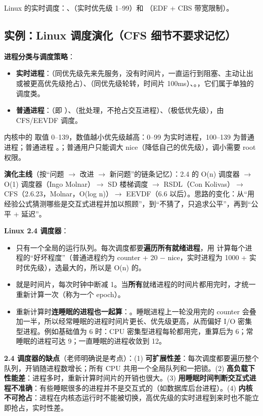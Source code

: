 Linux 的实时调度：、（实时优先级 1–99）和 （EDF + CBS 带宽限制）。

\subsection{实例：Linux 调度演化（CFS 细节不要求记忆）}

\textbf{进程分类与调度策略}：
\begin{itemize}
    \item \textbf{实时进程}：（同优先级先来先服务，没有时间片，一直运行到阻塞、主动让出或被更高优先级抢占）、（同优先级轮转，时间片 100ms）、。，它们属于单独的调度类。
    \item \textbf{普通进程}：（即 ）、（批处理，不抢占交互进程）、（极低优先级），由 CFS/EEVDF 调度。
\end{itemize}
内核中的  取值 0–139，数值越小优先级越高：0–99 为实时进程，100–139 为普通进程；普通进程 。\ez {}；普通用户只能调大 nice（降低自己的优先级），调小需要 root 权限。

\textbf{演化主线}（按“问题 $\to$ 改进 $\to$ 新问题”的链条记忆）：2.4 的 O(n) 调度器 $\to$ O(1) 调度器（Ingo Molnar）$\to$ SD 楼梯调度 $\to$ RSDL（Con Kolivas）$\to$ CFS（2.6.23，Molnar，O(log n)）$\to$ EEVDF（6.6 以后）。思路的变化：从“用经验公式猜测哪些是交互式进程并加以照顾”，到“不猜了，只追求公平”，再到“公平 + 延迟”。

\textbf{Linux 2.4 调度器}：
\begin{itemize}
    \item 只有一个全局的运行队列。每次调度都要\textbf{遍历所有就绪进程}，用  计算每个进程的“好坏程度”（普通进程约为 counter + 20 $-$ nice，实时进程为 1000 + 实时优先级），选最大的，所以是 O(n) 的。
    \item {} 就是时间片，每次时钟中断减 1。当\textbf{所有}就绪进程的时间片都用完时，才统一重新计算一次（称为一个 epoch）。
    \item 重新计算时\textbf{连睡眠的进程也一起算}：。睡眠进程上一轮没用完的 counter 会叠加一半，所以经常睡眠的进程时间片更长、优先级更高，从而偏好 I/O 密集型进程。例如基础值为 6 时：CPU 密集型进程每轮都用完，重算后为 6；常睡眠的进程可达 9；一直睡眠的进程收敛到 12。
\end{itemize}
\bk \textbf{2.4 调度器的缺点}（老师明确说是考点）：(1) \textbf{可扩展性差}：每次调度都要遍历整个队列，开销随进程数增长；所有 CPU 共用一个全局队列和一把锁。(2) \textbf{高负载下性能差}：进程多时，重新计算时间片的开销也很大。(3) \textbf{用睡眠时间判断交互式进程不准确}：有些睡眠很多的进程并不是交互式的（如数据库后台进程）。(4) \textbf{内核不可抢占}：进程在内核态运行时不能被切换，高优先级的实时进程到来时也不能立即抢占，实时性差。

